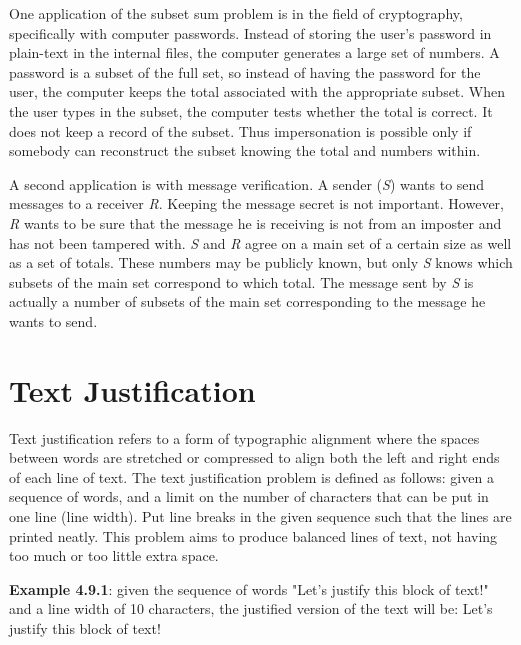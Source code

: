 One application of the subset sum problem is in the field of cryptography, specifically with computer passwords. Instead of storing the user's password in plain-text in the internal files, the computer generates a large set of numbers. A password is a subset of the full set, so instead of having the password for the user, the computer keeps the total associated with the appropriate subset. When the user types in the subset, the computer tests whether the total is correct. It does not keep a record of the subset. Thus impersonation is possible only if somebody can reconstruct the subset knowing the total and numbers within\cite{passwords}.

A second application is with message verification. A sender (\textit{S}) wants to send messages to a receiver \textit{R}. Keeping the message secret is not important. However, \textit{R} wants to be sure that the message he is receiving is not from an imposter and has not been tampered with. \textit{S} and \textit{R} agree on a main set of a certain size as well as a set of totals. These numbers may be publicly known, but only \textit{S} knows which subsets of the main set correspond to which total. The message sent by \textit{S} is actually a number of subsets of the main set corresponding to the message he wants to send\cite{passwords}.





\section{Text Justification}
Text justification refers to a form of typographic  alignment where the spaces between words are stretched or compressed to align both the left and right ends of each line of text. The text justification problem is defined as follows: given a sequence of words, and a limit on the number of characters that can be put in one line (line width). Put line breaks in the given sequence such that the lines are printed neatly. This problem aims to produce balanced lines of text, not having too much or too little extra space.

\medbreak
\textbf{Example 4.9.1}: given the sequence of words "Let's justify this block of text!" and a line width of 10 characters, the justified version of the text will be:
\smallbreak\noindent
Let's
\smallbreak\noindent
justify
\smallbreak\noindent
this block
\smallbreak\noindent
of text!

\smallbreak\noindent

